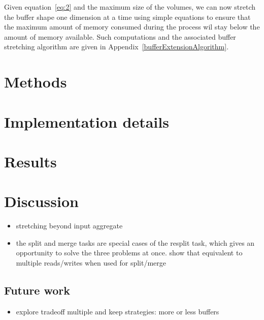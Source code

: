 \documentclass[conference]{IEEEtran}
\begin{document}
Given equation~\ref{eq:2} and the maximum size of the volumes, we can now
stretch the buffer shape one dimension at a time using simple equations to ensure
that the maximum amount of memory consumed during the process wil stay below the
amount of memory available. Such computations and the associated buffer stretching
algorithm are given in Appendix~\ref{bufferExtensionAlgorithm}.

\section{Methods}

\section{Implementation details}

\section{Results}

\section{Discussion}

\begin{itemize}
  \item stretching beyond input aggregate
  \item the split and merge tasks are special cases of the resplit task, which
  gives an opportunity to solve the three problems at once. show that equivalent
  to multiple reads/writes when used for split/merge
\end{itemize}

\subsection{Future work}
\begin{itemize}
  \item explore tradeoff multiple and keep strategies: more or less buffers
\end{itemize}


\end{document}

